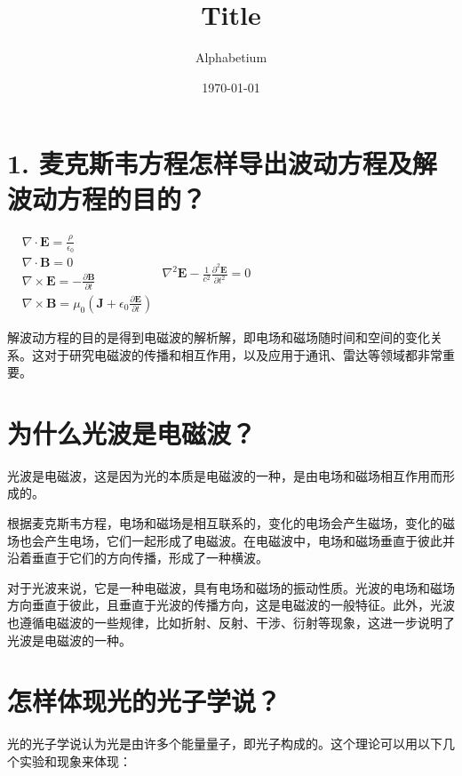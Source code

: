 \documentclass[12pt, a4paper, oneside]{article}
\title{Title}
\date{\today}
\author{Alphabetium}
\begin{document}
\begin{spacing}{2.0}
\tableofcontents
\maketitle

\section{1.	麦克斯韦方程怎样导出波动方程及解波动方程的目的？}
$\begin{aligned}
    & \nabla \cdot \mathbf{E} = \frac{\rho}{\epsilon_0} \\
    & \nabla \cdot \mathbf{B} = 0 \\
    & \nabla \times \mathbf{E} = -\frac{\partial \mathbf{B}}{\partial t} \\
    & \nabla \times \mathbf{B} = \mu_0 \left(\mathbf{J} + \epsilon_0 \frac{\partial \mathbf{E}}{\partial t}\right)
    \end{aligned}$
$\nabla^2 \mathbf{E} - \frac{1}{c^2} \frac{\partial^2 \mathbf{E}}{\partial t^2} = 0$    

解波动方程的目的是得到电磁波的解析解，即电场和磁场随时间和空间的变化关系。这对于研究电磁波的传播和相互作用，以及应用于通讯、雷达等领域都非常重要。

\section{为什么光波是电磁波？ }

光波是电磁波，这是因为光的本质是电磁波的一种，是由电场和磁场相互作用而形成的。

根据麦克斯韦方程，电场和磁场是相互联系的，变化的电场会产生磁场，变化的磁场也会产生电场，它们一起形成了电磁波。在电磁波中，电场和磁场垂直于彼此并沿着垂直于它们的方向传播，形成了一种横波。

对于光波来说，它是一种电磁波，具有电场和磁场的振动性质。光波的电场和磁场方向垂直于彼此，且垂直于光波的传播方向，这是电磁波的一般特征。此外，光波也遵循电磁波的一些规律，比如折射、反射、干涉、衍射等现象，这进一步说明了光波是电磁波的一种。




\section{怎样体现光的光子学说？}
光的光子学说认为光是由许多个能量量子，即光子构成的。这个理论可以用以下几个实验和现象来体现：\\


\end{spacing}
\end{document}
